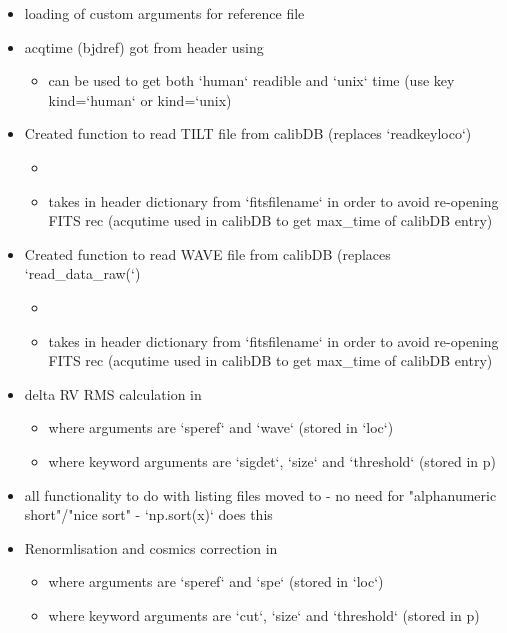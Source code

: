 \begin{itemize}
\item loading of custom arguments for reference file

\item acqtime (bjdref) got from header using 
	\begin{itemize}
	\item can be used to get both `human` readible and `unix` time (use key kind=`human` or kind=`unix)
	\end{itemize}

\item Created function to read TILT file from calibDB (replaces `readkeyloco`)
	\begin{itemize}
	\item {}
	\item takes in header dictionary from `fitsfilename` in order to avoid re-opening FITS rec (acqutime used in calibDB to get max\_time of calibDB entry) 
	\end{itemize}

\item Created function to read WAVE file from calibDB (replaces `read\_data\_raw(`)
	\begin{itemize}
	\item {}
	\item takes in header dictionary from `fitsfilename` in order to avoid re-opening FITS rec (acqutime used in calibDB to get max\_time of calibDB entry) 
	\end{itemize}

\item delta RV RMS calculation in 
	\begin{itemize}
	\item where arguments are `speref` and `wave` (stored in `loc`)
	\item where keyword arguments are `sigdet`, `size` and `threshold` (stored in p)
	\end{itemize}

\item all functionality to do with listing files moved to  - no need for "alphanumeric short"/"nice sort" - `np.sort(x)` does this
    
\item Renormlisation and cosmics correction in 
	\begin{itemize}
	\item where arguments are `speref` and `spe` (stored in `loc`)
	\item where keyword arguments are `cut`, `size` and `threshold` (stored in p)
	\end{itemize}


\end{itemize}
